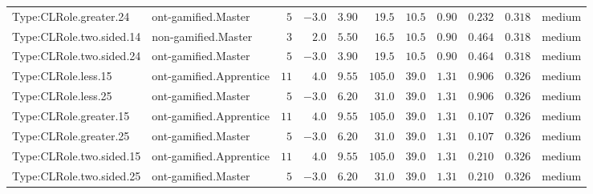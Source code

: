 \documentclass[6pt,a4paper]{article}
\begin{document}
{\begin{longtable}{llrrrrrrrrl}
Type:CLRole.greater.24&ont-gamified.Master&$ 5$&$-3.0$&$ 3.90$&$ 19.5$&$ 10.5$&$ 0.90$&$0.232$&$0.318$&medium\tabularnewline
Type:CLRole.two.sided.14&non-gamified.Master&$ 3$&$ 2.0$&$ 5.50$&$ 16.5$&$ 10.5$&$ 0.90$&$0.464$&$0.318$&medium\tabularnewline
Type:CLRole.two.sided.24&ont-gamified.Master&$ 5$&$-3.0$&$ 3.90$&$ 19.5$&$ 10.5$&$ 0.90$&$0.464$&$0.318$&medium\tabularnewline
Type:CLRole.less.15&ont-gamified.Apprentice&$11$&$ 4.0$&$ 9.55$&$105.0$&$ 39.0$&$ 1.31$&$0.906$&$0.326$&medium\tabularnewline
Type:CLRole.less.25&ont-gamified.Master&$ 5$&$-3.0$&$ 6.20$&$ 31.0$&$ 39.0$&$ 1.31$&$0.906$&$0.326$&medium\tabularnewline
Type:CLRole.greater.15&ont-gamified.Apprentice&$11$&$ 4.0$&$ 9.55$&$105.0$&$ 39.0$&$ 1.31$&$0.107$&$0.326$&medium\tabularnewline
Type:CLRole.greater.25&ont-gamified.Master&$ 5$&$-3.0$&$ 6.20$&$ 31.0$&$ 39.0$&$ 1.31$&$0.107$&$0.326$&medium\tabularnewline
\newpage
Type:CLRole.two.sided.15&ont-gamified.Apprentice&$11$&$ 4.0$&$ 9.55$&$105.0$&$ 39.0$&$ 1.31$&$0.210$&$0.326$&medium\tabularnewline
Type:CLRole.two.sided.25&ont-gamified.Master&$ 5$&$-3.0$&$ 6.20$&$ 31.0$&$ 39.0$&$ 1.31$&$0.210$&$0.326$&medium\tabularnewline
\hline
\end{longtable}}
\end{document}
